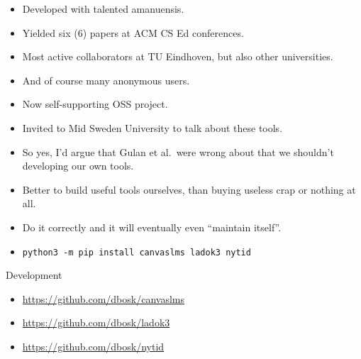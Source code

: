 \begin{frame}
  \begin{example}[RepoBee]
    \begin{itemize}
      \item Developed with talented amanuensis.
      \item Yielded six (6) papers at ACM CS Ed conferences.
      \item Most active collaborators at TU Eindhoven, but also other 
        universities.
      \item And of course many anonymous users.
      \item Now self-supporting OSS project.
    \end{itemize}
  \end{example}

  \pause

  \begin{example}
    \begin{itemize}
      \item Invited to Mid Sweden University to talk about these tools.
    \end{itemize}
  \end{example}
\end{frame}

\begin{frame}[fragile]
  \begin{remark}
    \begin{itemize}
      \item So yes, I'd argue that Gulan et al.~were wrong about that we 
        shouldn't developing our own tools.
      \item Better to build useful tools ourselves, than buying useless crap or 
        nothing at all.
      \item Do it correctly and it will eventually even \enquote{maintain 
        itself}.
    \end{itemize}
  \end{remark}
\end{frame}

\begin{frame}[fragile]
  \begin{example}[Installation]
    \begin{itemize}
      \item \texttt{python3 -m pip install canvaslms ladok3 nytid}
    \end{itemize}
  \end{example}

  \pause

  \begin{block}{Development}
    \begin{itemize}
      \item \url{https://github.com/dbosk/canvaslms}
      \item \url{https://github.com/dbosk/ladok3}
      \item \url{https://github.com/dbosk/nytid}
    \end{itemize}
  \end{block}
\end{frame}

